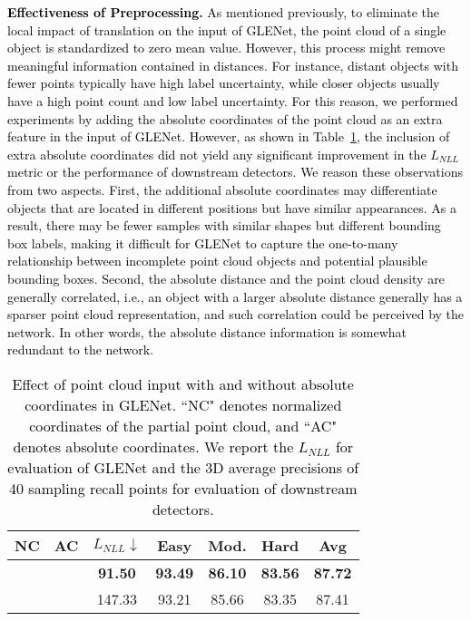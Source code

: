 \documentclass[twocolumn]{svjour3}
\newcommand{\revise}[1]{\textcolor{black}{#1}}
\begin{document}
\noindent
\revise{
	\textbf{Effectiveness of Preprocessing.} As mentioned previously, to eliminate the local impact of translation on the input of GLENet, the point cloud of a single object is standardized to zero mean value. However, this process might remove meaningful information contained in distances. For instance, distant objects with fewer points typically have high label uncertainty, while closer objects usually have a high point count and low label uncertainty.
	For this reason, we performed experiments by adding the absolute coordinates of the point cloud as an extra feature in the input of GLENet. However, as shown in Table~\ref{table:ablation_input}, the inclusion of extra absolute coordinates did not yield any significant improvement in the $L_{NLL}$ metric or the performance of downstream detectors.
	We reason these observations from two aspects. First, the additional absolute coordinates may differentiate objects that are located in different positions but have similar appearances. As a result, there may be fewer samples with similar shapes but different bounding box labels, making it difficult for GLENet to capture the one-to-many relationship between incomplete point cloud objects and potential plausible bounding boxes. Second, the absolute distance and the point cloud density are generally correlated, i.e., an object with a larger absolute distance generally has a sparser point cloud representation, and such correlation could be perceived by the network. In other words, the absolute distance information is somewhat redundant to the network.
}\\

\setlength{\tabcolsep}{5pt}
\begin{table}[t]
	\centering
	\caption{\revise{Effect of point cloud input with and without absolute coordinates in GLENet. ``NC" denotes normalized coordinates of the partial point cloud, and ``AC" denotes absolute coordinates. We report the $L_{NLL}$ for evaluation of GLENet and the 3D average precisions of 40 sampling recall points for evaluation of downstream detectors.}}
	\label{table:ablation_input}
	\begin{tabular}{cc|c|cccc} 
		\toprule
		NC & AC &  $L_{NLL}$$\downarrow$       & Easy  & Mod.  & Hard  & Avg    \\ 
		\hline
		\checkmark                    &                        & \textbf{91.50}    & \textbf{93.49} & \textbf{86.10} & \textbf{83.56} & \textbf{87.72}  \\
		\checkmark                    & \checkmark                      & 147.33 & 93.21 & 85.66 & 83.35 & 87.41  \\
		\bottomrule
	\end{tabular}
\end{table}
\setlength{\tabcolsep}{1.5pt}
\end{document}
